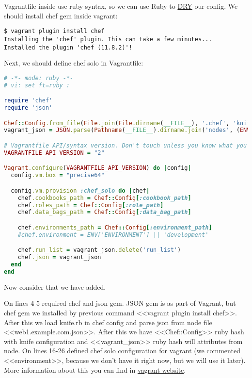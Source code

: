 Vagrantfile inside use ruby syntax, so we can use Ruby to \href{http://en.wikipedia.org/wiki/Dont\_repeat\_yourself}{DRY} our config. We should install chef gem inside vagrant:

\begin{lstlisting}[label=lst:my-cloud-vagrant6]
$ vagrant plugin install chef
Installing the 'chef' plugin. This can take a few minutes...
Installed the plugin 'chef (11.8.2)'!
\end{lstlisting}

Next, we should define chef solo in Vagrantfile:

\begin{lstlisting}[language=Ruby,label=lst:my-cloud-vagrant7,title=my-cloud/nodes/Vagrantfile]
# -*- mode: ruby -*-
# vi: set ft=ruby :

require 'chef'
require 'json'

Chef::Config.from_file(File.join(File.dirname(__FILE__), '.chef', 'knife.rb'))
vagrant_json = JSON.parse(Pathname(__FILE__).dirname.join('nodes', (ENV['NODE'] || 'web1.example.com.json')).read)

# Vagrantfile API/syntax version. Don't touch unless you know what you're doing!
VAGRANTFILE_API_VERSION = "2"

Vagrant.configure(VAGRANTFILE_API_VERSION) do |config|
  config.vm.box = "precise64"

  config.vm.provision :chef_solo do |chef|
    chef.cookbooks_path = Chef::Config[:cookbook_path]
    chef.roles_path = Chef::Config[:role_path]
    chef.data_bags_path = Chef::Config[:data_bag_path]

    chef.environments_path = Chef::Config[:environment_path]
    #chef.environment = ENV['ENVIRONMENT'] || 'development'

    chef.run_list = vagrant_json.delete('run_list')
    chef.json = vagrant_json
  end
end
\end{lstlisting}

Now consider that we have added.

On lines 4-5 required chef and json gem. JSON gem is as part of Vagrant, but chef gem we installed by previous command <<vagrant plugin install chef>>. After this we load knife.rb in chef config and parse json from node file <<web1.example.com.json>>. After this we have <<Chef::Config>> ruby hash with knife configuration and <<vagrant\_json>> ruby hash will attributes from node. On lines 16-26 defined chef solo configuration for vagrant (we commented <<environment>>, because we don't have it right now, but we will use it later). More information about this you can find in \href{http://docs.vagrantup.com/v2/provisioning/chef\_solo.html}{vagrant website}.

